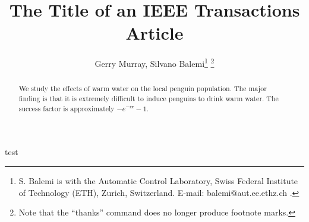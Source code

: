 \documentclass[twocolumn]{IEEEtran}
\begin{document}
\title{The Title of an IEEE Transactions Article}
\author{Gerry Murray, Silvano Balemi\thanks{%
S. Balemi is with the Automatic Control Laboratory, Swiss Federal Institute
of Technology (ETH), Zurich, Switzerland. E-mail: balemi@aut.ee.ethz.ch .}%
\thanks{%
Note that the ``thanks'' command does no longer produce footnote marks.}}
\maketitle

\begin{abstract}
We study the effects of warm water on the local penguin population. The
major finding is that it is extremely difficult to induce penguins to drink
warm water. The success factor is approximately $-e^{-i\pi }-1$.
\end{abstract}

test \cite{Weiner85}
\end{document}
